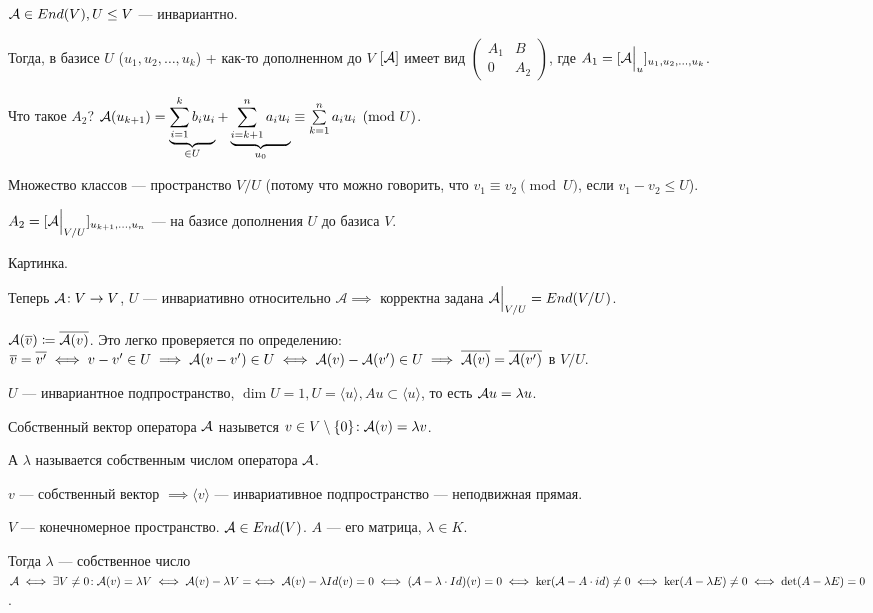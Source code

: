 \begin{statement}
    $\mathcal{A} \in End(V), U \le V$ --- инвариантно.

    Тогда, в базисе $U$ ($u_1, u_2,\ldots, u_k$) + как-то дополненном до  $V$  $[\mathcal{A}]$ имеет вид $\left(\begin{array}{c|c} A_1 & B \\ \hline 0 & A_2 \end{array} \right)$, где  $A_1 = [\mathcal{A} \Big|_u]_{u_1, u_2, \ldots, u_k}$.

    Что такое $A_2$?  $\mathcal{A}(u_{k+1}) = \underbrace{\sum\limits_{i=1}^k b_i u_i}_{\in U} + \underbrace{\sum\limits_{i=k+1}^n a_iu_i}_{u_0} \equiv \sum\limits_{k=1}^n a_i u_i \pmod U$.

    Множество классов --- пространство  $V / U$ (потому что можно говорить, что $v_1 \equiv v_2 \pmod U$, если $v_1 - v_2 \le U$).

    $A_2 = [\mathcal{A} \Big|_{V / U}]_{u_{k+1}, \ldots, u_n}$ --- на базисе дополнения $U$ до базиса  $V$.
\end{statement}
\begin{example}
Картинка.

\end{example}

Теперь $\mathcal{A}\!: V \to V$,  $U$ --- инвариативно относительно  $\mathcal{A} \implies $ корректна задана $\mathcal{A} \Big|_{V / U} = End(V / U)$. 

$\mathcal{A}(\overline{v}) \coloneqq \overline{\mathcal{A}(v)}$. Это легко проверяется по определению:  $\overline{v} = \overline{v'} \iff v - v' \in U \implies \mathcal{A}(v - v') \in U \iff \mathcal{A}(v) - \mathcal{A}(v') \in U \implies \overline{\mathcal{A}(v)} = \overline{\mathcal{A}(v')}$ в  $V / U$.

$U$ --- инвариантное подпространство,  $\dim U = 1, U = \langle u \rangle, Au \subset \langle u \rangle$, то есть $\mathcal{A} u = \lambda u$.

\begin{definition}
    Собственный вектор оператора $\mathcal{A}$ назывется $v \in V \setminus \{0\}\!: \mathcal{A}(v) = \lambda v$.

    А $\lambda$ называется собственным числом оператора $\mathcal{A}$.

    $v$ --- собственный вектор  $\implies \langle v \rangle$ --- инвариативное подпространство --- неподвижная прямая.
\end{definition}

    $V$ --- конечномерное пространство. $\mathcal{A} \in End(V)$.  $A$ --- его матрица,  $\lambda \in K$.

    Тогда $\lambda$ --- собственное число  $\mathcal{A} \iff \exists V \neq 0\!: \mathcal{A}(v) = \lambda V \iff \mathcal{A}(v) - \lambda V = \iff \mathcal{A}(v) - \lambda Id(v) = 0 \iff (\mathcal{A} - \lambda \cdot Id)(v) = 0 \iff \ker (\mathcal{A} - A \cdot id) \neq 0 \iff \ker (A - \lambda E) \neq 0 \iff \det (A - \lambda E) = 0$.

